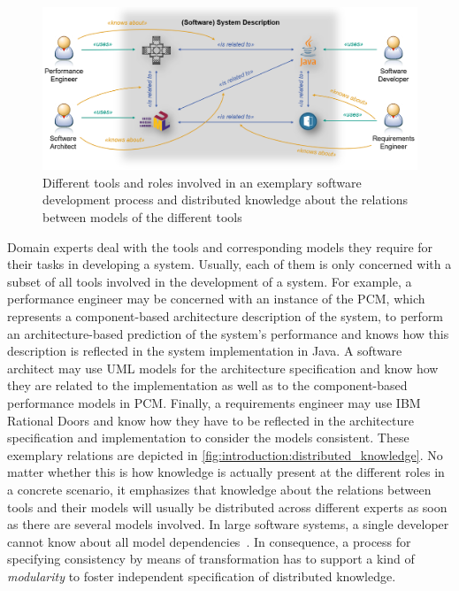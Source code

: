 \begin{figure}
    \centering
    \includegraphics[width=\textwidth]{figures/prologue/introduction/distributed_knowledge.png}
    \caption[Tools and distributed knowledge in engineering processes]{Different tools and roles involved in an exemplary software development process and distributed knowledge about the relations between models of the different tools}
    \label{fig:introduction:distributed_knowledge}
\end{figure}

Domain experts deal with the tools and corresponding models they require for their tasks in developing a system.
Usually, each of them is only concerned with a subset of all tools involved in the development of a system.
For example, a performance engineer may be concerned with an instance of the \gls{PCM}, which represents a component-based architecture description of the system, to perform an architecture-based prediction of the system's performance and knows how this description is reflected in the system implementation in Java.
A software architect may use \gls{UML} models for the architecture specification and know how they are related to the implementation as well as to the component-based performance models in \gls{PCM}.
Finally, a requirements engineer may use IBM Rational Doors and know how they have to be reflected in the architecture specification and implementation to consider the models consistent.
These exemplary relations are depicted in \autoref{fig:introduction:distributed_knowledge}.
No matter whether this is how knowledge is actually present at the different roles in a concrete scenario, it emphasizes that knowledge about the relations between tools and their models will usually be distributed across different experts as soon as there are several models involved.
In large software systems, a single developer cannot know about all model dependencies~\cite{petrenko2008a}.
In consequence, a process for specifying consistency by means of transformation has to support a kind of \emph{modularity} to foster independent specification of distributed knowledge.

